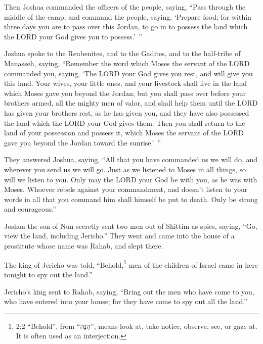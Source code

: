 \myverse{}Then Joshua commanded the officers of the people, saying,
\myverse{}“Pass through the middle of the camp, and command the people, saying, ‘Prepare
food; for within three days you are to pass over this Jordan, to go in to possess the land which the LORD
your God gives you to possess.’ ”

\myverse{}Joshua spoke to the Reubenites, and to the Gadites, and to the
half-tribe of Manasseh, saying,
\myverse{}“Remember the word which Moses the servant of the LORD commanded you, saying,
‘The LORD your God gives you rest, and will give you this land.
\myverse{}Your wives, your little ones, and your livestock shall live in the land which
Moses gave you beyond the Jordan; but you shall pass over before your brothers armed, all the mighty men
of valor, and shall help them
\myverse{}until the LORD has given your brothers rest, as he has given you, and they
have also possessed the land which the LORD your God gives them. Then you shall return to the land of
your possession and possess it, which Moses the servant of the LORD gave you beyond the Jordan toward
the sunrise.’ ”

\myverse{}They answered Joshua, saying, “All that you have commanded us
we will do, and wherever you send us we will go.
\myverse{}Just as we listened to Moses in all things, so will we listen to you. Only
may the LORD your God be with you, as he was with Moses.
\myverse{}Whoever rebels against your commandment, and doesn’t listen to your words
in all that you command him shall himself be put to death. Only be strong and courageous.”


\mychapter{} \myverse*{}Joshua the son of Nun secretly sent two men out of Shittim as spies,
saying, “Go, view the land, including Jericho.” They went and came into the house of a prostitute whose
name was Rahab, and slept there.

\myverse{}The king of Jericho was told, “Behold,\footnote{2:2 “Behold”, from “הִנֵּה”, means look at, take notice, observe, see, or gaze at. It is
	often used as an interjection.} men of the children of Israel came in here tonight to spy out
the land.”

\myverse{}Jericho’s king sent to Rahab, saying, “Bring out the men who have
come to you, who have entered into your house; for they have come to spy out all the land.”

